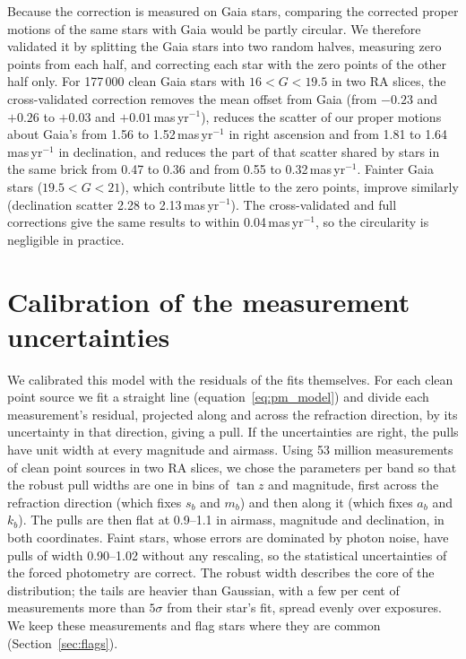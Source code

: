 \documentclass[usenatbib]{mnras}   %
\begin{document}
Because the correction is measured on Gaia stars, comparing the corrected proper motions of the same stars with Gaia would be partly circular. We therefore validated it by splitting the Gaia stars into two random halves, measuring zero points from each half, and correcting each star with the zero points of the other half only. For 177\,000 clean Gaia stars with $16 < G < 19.5$ in two RA slices, the cross-validated correction removes the mean offset from Gaia (from $-0.23$ and $+0.26$ to $+0.03$ and $+0.01$\,mas\,yr$^{-1}$), reduces the scatter of our proper motions about Gaia's from 1.56 to 1.52\,mas\,yr$^{-1}$ in right ascension and from 1.81 to 1.64\,mas\,yr$^{-1}$ in declination, and reduces the part of that scatter shared by stars in the same brick from 0.47 to 0.36 and from 0.55 to 0.32\,mas\,yr$^{-1}$. Fainter Gaia stars ($19.5 < G < 21$), which contribute little to the zero points, improve similarly (declination scatter 2.28 to 2.13\,mas\,yr$^{-1}$). The cross-validated and full corrections give the same results to within 0.04\,mas\,yr$^{-1}$, so the circularity is negligible in practice.

\section{Calibration of the measurement uncertainties} \label{app:errors}

We calibrated this model with the residuals of the fits themselves. For each clean point source we fit a straight line (equation~\ref{eq:pm_model}) and divide each measurement's residual, projected along and across the refraction direction, by its uncertainty in that direction, giving a pull. If the uncertainties are right, the pulls have unit width at every magnitude and airmass. Using 53 million measurements of clean point sources in two RA slices, we chose the parameters per band so that the robust pull widths are one in bins of $\tan z$ and magnitude, first across the refraction direction (which fixes $s_b$ and $m_b$) and then along it (which fixes $a_b$ and $k_b$). The pulls are then flat at 0.9--1.1 in airmass, magnitude and declination, in both coordinates. Faint stars, whose errors are dominated by photon noise, have pulls of width 0.90--1.02 without any rescaling, so the statistical uncertainties of the forced photometry are correct. The robust width describes the core of the distribution; the tails are heavier than Gaussian, with a few per cent of measurements more than $5\sigma$ from their star's fit, spread evenly over exposures. We keep these measurements and flag stars where they are common (Section~\ref{sec:flags}).
\end{document}
